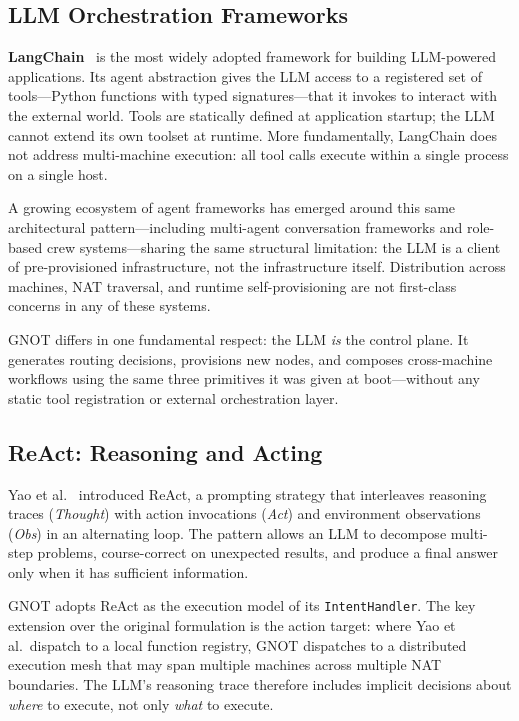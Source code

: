 \documentclass[10pt,twocolumn]{article}
\begin{document}
\subsection{LLM Orchestration Frameworks}

\textbf{LangChain}~\cite{langchain2023} is the most widely adopted
framework for building LLM-powered applications. Its agent abstraction
gives the LLM access to a registered set of tools---Python functions
with typed signatures---that it invokes to interact with the external
world. Tools are statically defined at application startup; the LLM
cannot extend its own toolset at runtime. More fundamentally, LangChain
does not address multi-machine execution: all tool calls execute within
a single process on a single host.

A growing ecosystem of agent frameworks has emerged around this same
architectural pattern---including multi-agent conversation frameworks
and role-based crew systems---sharing the same structural
limitation: the LLM is a client of pre-provisioned infrastructure,
not the infrastructure itself. Distribution across machines, NAT
traversal, and runtime self-provisioning are not first-class concerns
in any of these systems.

GNOT differs in one fundamental respect: the LLM \emph{is} the control
plane. It generates routing decisions, provisions new nodes, and
composes cross-machine workflows using the same three primitives it was
given at boot---without any static tool registration or external
orchestration layer.

\subsection{ReAct: Reasoning and Acting}

Yao et al.~\cite{react2022} introduced ReAct, a prompting strategy that
interleaves reasoning traces (\emph{Thought}) with action invocations
(\emph{Act}) and environment observations (\emph{Obs}) in an alternating
loop. The pattern allows an LLM to decompose multi-step problems, course-correct
on unexpected results, and produce a final answer only when it
has sufficient information.

GNOT adopts ReAct as the execution model of its \texttt{IntentHandler}.
The key extension over the original formulation is the action
target: where Yao et al.\ dispatch to a local function registry,
GNOT dispatches to a distributed execution mesh that may span multiple
machines across multiple NAT boundaries. The LLM's reasoning trace
therefore includes implicit decisions about \emph{where} to execute,
not only \emph{what} to execute.
\end{document}
